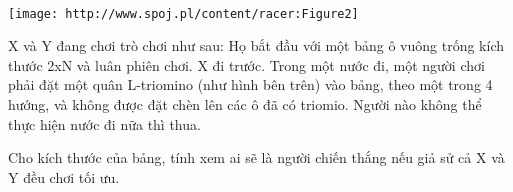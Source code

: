 


\texttt{[image: http://www.spoj.pl/content/racer:Figure2]}

X và Y đang chơi trò chơi như sau: Họ bắt đầu với một bảng ô vuông trống kích thước 2xN và luân phiên chơi. X đi trước. Trong một nước đi, một người chơi phải đặt một quân L-triomino (như hình bên trên) vào bảng, theo một trong 4 hướng, và không được đặt chèn lên các ô đã có triomio. Người nào không thể thực hiện nước đi nữa thì thua.

Cho kích thước của bảng, tính xem ai sẽ là người chiến thắng nếu giả sử cả X và Y đều chơi tối ưu.